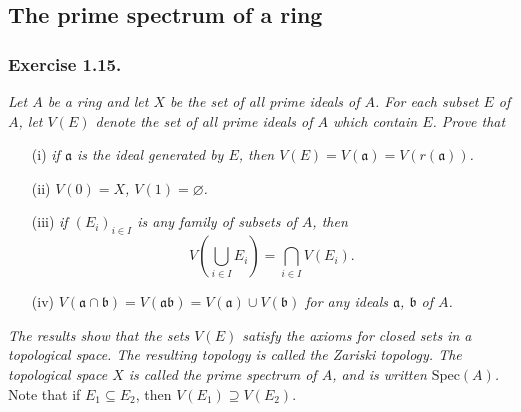 \documentclass{article}
\begin{document}
\subsection*{The prime spectrum of a ring \\}



\subsubsection*{Exercise 1.15.}
\emph{Let $A$ be a ring and let $X$ be the set of all prime ideals of $A$.
For each subset $E$ of $A$,
let $V(E)$ denote the set of all prime ideals of $A$ which contain $E$.
Prove that}
\begin{enumerate}
\item[(i)]
  \emph{if $\mathfrak{a}$ is the ideal generated by $E$,
  then $V(E) = V(\mathfrak{a}) = V(r(\mathfrak{a}))$.}

\item[(ii)]
  \emph{$V(0) = X$, $V(1) = \varnothing$.}

\item[(iii)]
  \emph{if $(E_i)_{i \in I}$ is any family of subsets of $A$,
  then
  $$V\left( \bigcup_{i \in I}E_i \right) = \bigcap_{i \in I} V(E_i).$$}

\item[(iv)]
  \emph{$V(\mathfrak{a} \cap \mathfrak{b})
  = V(\mathfrak{a} \mathfrak{b})
  = V(\mathfrak{a}) \cup V(\mathfrak{b})$
  for any ideals $\mathfrak{a}$, $\mathfrak{b}$ of $A$.}
\end{enumerate}


\emph{The results show that the sets $V(E)$ satisfy
the axioms for closed sets in a topological space.
The resulting topology is called the Zariski topology.
The topological space $X$ is called the prime spectrum of $A$,
and is written $\mathrm{Spec}(A)$.} \\



Note that if $E_1 \subseteq E_2$,
then $V(E_1) \supseteq V(E_2)$. \\
\end{document}
